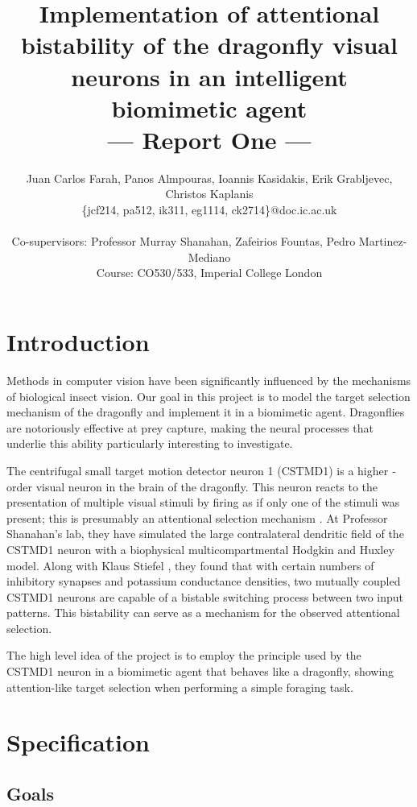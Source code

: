 \documentclass[a4paper,11pt]{article}
\title{Implementation of attentional bistability of the dragonfly visual neurons in an intelligent biomimetic agent\\\Large{--- Report One ---}}
\author{Juan Carlos Farah, Panos Almpouras, Ioannis Kasidakis, Erik Grabljevec, Christos Kaplanis\\
       \{jcf214, pa512, ik311, eg1114, ck2714\}@doc.ic.ac.uk\\ \\
       \small{Co-supervisors: Professor Murray Shanahan, Zafeirios Fountas, Pedro Martinez-Mediano}\\
       \small{Course: CO530/533, Imperial College London}
}
\begin{document}
\maketitle

\section{Introduction}

Methods in computer vision have been significantly influenced by the mechanisms of biological insect vision. Our goal in this project is to model the target selection mechanism of the dragonfly and implement it in a biomimetic agent. Dragonflies are notoriously effective at prey capture, making the neural processes that underlie this ability particularly interesting to investigate. 

The centrifugal small ­target motion detector neuron 1 (CSTMD1) is a higher ­order visual neuron in the brain of the dragonfly. This neuron reacts to the presentation of multiple visual stimuli by firing as if only one of the stimuli was present; this is presumably an attentional selection mechanism \cite{w13}. At Professor Shanahan's lab, they have simulated the large contralateral dendritic field of the CSTMD1 neuron with a biophysical multi­compartmental Hodgkin and Huxley model. Along with Klaus Stiefel \cite{ne13}, they found that with certain numbers of inhibitory synapses and potassium conductance densities, two mutually coupled CSTMD1 neurons are capable of a bistable switching process between two input patterns. This bistability can serve as a mechanism for the observed attentional selection.

The high­ level idea of the project is to employ the principle used by the CSTMD1 neuron in a biomimetic agent that behaves like a dragonfly, showing attention-­like target selection when performing a simple foraging task.



\section{Specification}
	\subsection{Goals}	
	
\end{document}
